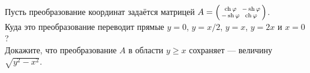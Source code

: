 \documentclass[a4paper,11pt]{article}
\newcommand{\smat}[1]{\hr{\begin{smallmatrix}#1\end{smallmatrix}}}
\newcommand{\мв}{\,м$_в$}
\begin{document}
Пусть преобразование координат задаётся матрицей $A = \smat{\ch\ph&-\sh\ph\\-\sh\ph&\ch\ph}$.
\\
Куда это преобразование переводит прямые $y=0$, $y=x/2$, $y=x$, $y=2x$ и $x=0$?
\\
Докажите, что преобразование $A$ в области $y\ge x$ сохраняет  --- величину $\sqrt{y^2-x^2}$.


\end{document}
